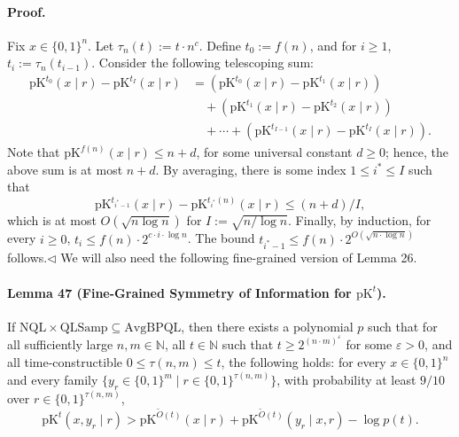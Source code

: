 \paragraph{Proof.} Fix $x\in\{0,1\}^n$. Let $\tau_n(t):=t\cdot n^c$. Define $t_0:=f(n)$, and for $i\geq1$, $t_i:=\tau_n(t_{i-1})$. Consider the following telescoping sum:
\begin{align*}
\mathrm{pK}^{t_0}(x\mid r)-\mathrm{pK}^{t_I}(x\mid r)
&=(\mathrm{pK}^{t_0}(x\mid r)-\mathrm{pK}^{t_1}(x\mid r))\\
&\quad+(\mathrm{pK}^{t_1}(x\mid r)-\mathrm{pK}^{t_2}(x\mid r))\\
&\quad+\cdots+(\mathrm{pK}^{t_{I-1}}(x\mid r)-\mathrm{pK}^{t_I}(x\mid r)).
\end{align*}
Note that $\mathrm{pK}^{f(n)}(x\mid r)\leq n+d$, for some universal constant $d\geq0$; hence, the above sum is at most $n+d$. By averaging, there is some index $1\leq i^*\leq I$ such that
\[\mathrm{pK}^{t_{i^*-1}}(x\mid r)-\mathrm{pK}^{t_{i^*}(n)}(x\mid r)\leq(n+d)/I,\]
which is at most $O(\sqrt{n\log n})$ for $I:=\sqrt{n/\log n}$. Finally, by induction, for every $i\geq0$, $t_i\leq f(n)\cdot2^{c\cdot i\cdot\log n}$. The bound $t_{i^*-1}\leq f(n)\cdot2^{O(\sqrt{n\cdot\log n})}$ follows.\hfill$\triangleleft$
We will also need the following fine-grained version of Lemma 26.
\paragraph{Lemma 47 (Fine-Grained Symmetry of Information for $\mathrm{pK}^t$).} If $\mathrm{NQL}\times\mathrm{QLSamp}\subseteq\mathrm{AvgBPQL}$, then there exists a polynomial $p$ such that for all sufficiently large $n,m\in\mathbb N$, all $t\in\mathbb N$ such that $t\geq2^{(n\cdot m)^\varepsilon}$ for some $\varepsilon>0$, and all time-constructible $0\leq\tau(n,m)\leq t$, the following holds: for every $x\in\{0,1\}^n$ and every family $\{y_r\in\{0,1\}^m\mid r\in\{0,1\}^{\tau(n,m)}\}$, with probability at least $9/10$ over $r\in\{0,1\}^{\tau(n,m)}$,
\[\mathrm{pK}^t(x,y_r\mid r)>\mathrm{pK}^{\widetilde O(t)}(x\mid r)+\mathrm{pK}^{\widetilde O(t)}(y_r\mid x,r)-\log p(t).\]
